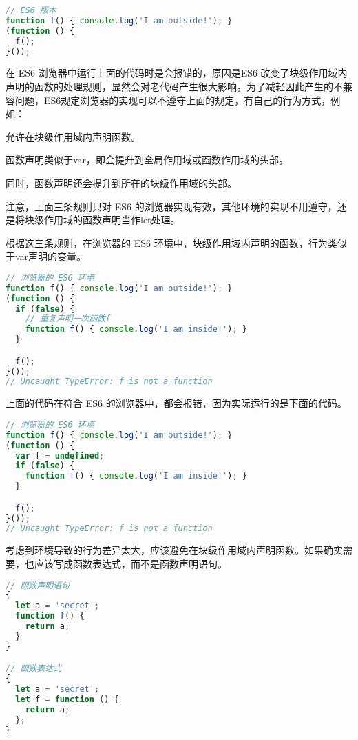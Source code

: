 \begin{lstlisting}[language=JavaScript]
// ES6 版本
function f() { console.log('I am outside!'); }
(function () {
  f();
}());
\end{lstlisting}

在 ES6 浏览器中运行上面的代码时是会报错的，原因是ES6 改变了块级作用域内声明的函数的处理规则，显然会对老代码产生很大影响。为了减轻因此产生的不兼容问题，ES6规定浏览器的实现可以不遵守上面的规定，有自己的行为方式，例如：

\begin{compactitem}
\item 允许在块级作用域内声明函数。
\item 函数声明类似于var，即会提升到全局作用域或函数作用域的头部。
\item 同时，函数声明还会提升到所在的块级作用域的头部。
\end{compactitem}

注意，上面三条规则只对 ES6 的浏览器实现有效，其他环境的实现不用遵守，还是将块级作用域的函数声明当作let处理。


根据这三条规则，在浏览器的 ES6 环境中，块级作用域内声明的函数，行为类似于var声明的变量。




\begin{lstlisting}[language=JavaScript]
// 浏览器的 ES6 环境
function f() { console.log('I am outside!'); }
(function () {
  if (false) {
    // 重复声明一次函数f
    function f() { console.log('I am inside!'); }
  }

  f();
}());
// Uncaught TypeError: f is not a function
\end{lstlisting}

上面的代码在符合 ES6 的浏览器中，都会报错，因为实际运行的是下面的代码。




\begin{lstlisting}[language=JavaScript]
// 浏览器的 ES6 环境
function f() { console.log('I am outside!'); }
(function () {
  var f = undefined;
  if (false) {
    function f() { console.log('I am inside!'); }
  }

  f();
}());
// Uncaught TypeError: f is not a function
\end{lstlisting}

考虑到环境导致的行为差异太大，应该避免在块级作用域内声明函数。如果确实需要，也应该写成函数表达式，而不是函数声明语句。


\begin{lstlisting}[language=JavaScript]
// 函数声明语句
{
  let a = 'secret';
  function f() {
    return a;
  }
}

// 函数表达式
{
  let a = 'secret';
  let f = function () {
    return a;
  };
}
\end{lstlisting}


